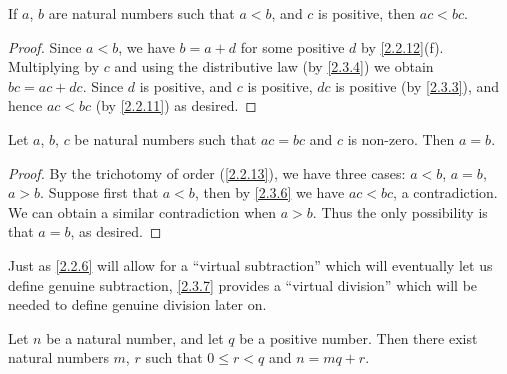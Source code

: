\begin{proposition}\label{2.3.6}
  If \(a\), \(b\) are natural numbers such that \(a < b\), and \(c\) is positive, then \(ac < bc\).
\end{proposition}

\begin{proof}
  Since \(a < b\), we have \(b = a + d\) for some positive \(d\) by \cref{2.2.12}(f).
  Multiplying by \(c\) and using the distributive law (by \cref{2.3.4}) we obtain \(bc = ac + dc\).
  Since \(d\) is positive, and \(c\) is positive, \(dc\) is positive (by \cref{2.3.3}), and hence \(ac < bc\) (by \cref{2.2.11}) as desired.
\end{proof}

\begin{corollary}\label{2.3.7}
  Let \(a\), \(b\), \(c\) be natural numbers such that \(ac = bc\) and \(c\) is non-zero.
  Then \(a = b\).
\end{corollary}

\begin{proof}
  By the trichotomy of order (\cref{2.2.13}), we have three cases: \(a < b\), \(a = b\), \(a > b\).
  Suppose first that \(a < b\), then by \cref{2.3.6} we have \(ac < bc\), a contradiction.
  We can obtain a similar contradiction when \(a > b\).
  Thus the only possibility is that \(a = b\), as desired.
\end{proof}

\begin{remark}\label{2.3.8}
  Just as \cref{2.2.6} will allow for a ``virtual subtraction'' which will eventually let us define genuine subtraction, \cref{2.3.7} provides a ``virtual division'' which will be needed to define genuine division later on.
\end{remark}

\begin{proposition}\label{2.3.9}
  Let \(n\) be a natural number, and let \(q\) be a positive number.
  Then there exist natural numbers \(m\), \(r\) such that \(0 \leq r < q\) and \(n = mq + r\).
\end{proposition}

